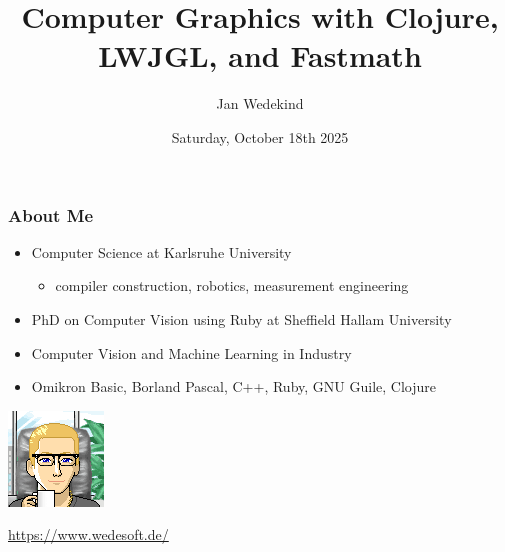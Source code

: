 \documentclass[aspectratio=169,11pt,xcolor=dvipsnames]{beamer}
\title{Computer Graphics with Clojure, LWJGL, and Fastmath}
\author{Jan Wedekind}
\date{Saturday, October 18th 2025}
\begin{document}
\begin{frame}
  \titlepage{}
\end{frame}

\begin{frame}
  \frametitle{About Me}
  \begin{minipage}[b]{0.79\textwidth}
    \begin{itemize}
      \item Computer Science at Karlsruhe University
        \begin{itemize}
          \item compiler construction, robotics, measurement engineering
        \end{itemize}
      \item PhD on Computer Vision using Ruby at Sheffield Hallam University
      \item Computer Vision and Machine Learning in Industry
      \item Omikron Basic, Borland Pascal, C++, Ruby, GNU Guile, Clojure
    \end{itemize}
  \end{minipage}
  \begin{minipage}[b]{0.2\textwidth}
    \includegraphics[width=\textwidth]{avatar}\\
    \begin{tiny}
      \url{https://www.wedesoft.de/}
    \end{tiny}
  \end{minipage}
\end{frame}
\end{document}
